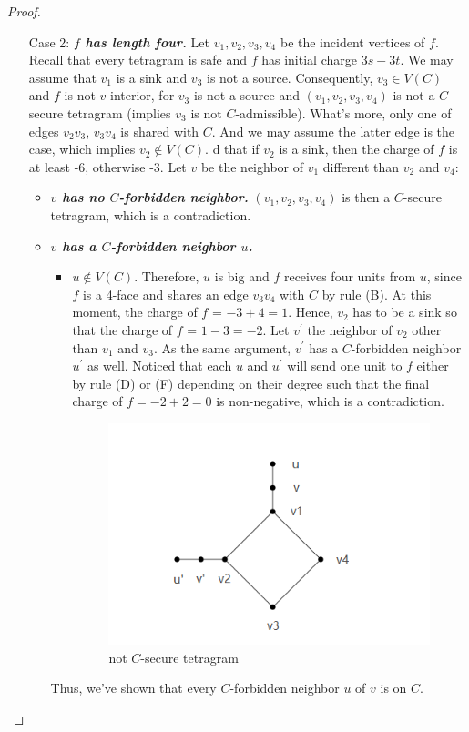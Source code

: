 \begin{proof}
\begin{itemize}
    \item[Case 2: ] \textit{\textbf{$f$ has length four.}} Let $v_1, v_2, v_3, v_4$ be the incident vertices of $f$. Recall that every tetragram is safe and $f$ has initial charge $3s - 3t$. We may assume that $v_1$ is a sink and $v_3$ is not a source. Consequently, $v_3 \in V(C)$ and $f$ is not $v$-interior, for $v_3$ is not a source and $(v_1, v_2, v_3, v_4)$ is not a $C$-secure tetragram (implies $v_3$ is not $C$-admissible). What's more, only one of edges $v_2v_3$, $v_3v_4$ is shared with $C$. And we may assume the latter edge is the case, which implies $v_2 \notin V(C)$. d that if $v_2$ is a sink, then the charge of $f$ is at least -6, otherwise -3. Let $v$ be the neighbor of $v_1$ different than $v_2$ and $v_4$: 
    \begin{itemize}
        \item \textit{\textbf{$v$ has no $C$-forbidden neighbor.}} $(v_1, v_2, v_3, v_4)$ is then a $C$-secure tetragram, which is a contradiction.
        
        \item \textit{\textbf{$v$ has a $C$-forbidden neighbor $u$.}} 
            \begin{itemize}
                \item $u \notin V(C)$. Therefore, $u$ is big and $f$ receives four units from $u$, since $f$ is a 4-face and shares an edge $v_3v_4$ with $C$ by rule (B). At this moment, the charge of $f$ = $-3 + 4 = 1$. Hence, $v_2$ has to be a sink so that the charge of $f$ = $1 - 3 = -2$. Let $v^{'}$ the neighbor of $v_2$ other than $v_1$ and $v_3$. As the same argument, $v^{'}$ has a $C$-forbidden neighbor $u^{'}$ as well. Noticed that each $u$ and $u^{'}$ will send one unit to $f$ either by rule (D) or (F) depending on their degree such that the final charge of $f = -2 + 2 = 0$ is non-negative, which is a contradiction. 
                \begin{figure}[H] %
                    \centering %
                    \includegraphics[width=0.5 \textwidth]{figure/notcsecuretetragram.png} 
                    \caption{not $C$-secure tetragram} %
                    \label{figure} %
                \end{figure}
            \end{itemize}
        Thus, we've shown that every $C$-forbidden neighbor $u$ of $v$ is on $C$.
        

\end{itemize}
\end{itemize}
\end{proof}
